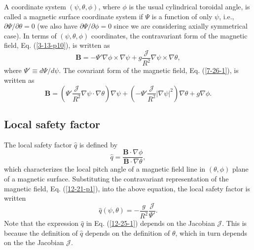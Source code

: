 \documentclass{llncs}
\begin{document}
A coordinate system $(\psi, \theta, \phi)$, where $\phi$ is the usual
cylindrical toroidal angle, is called a magnetic surface coordinate system if
$\Psi$ is a function of only $\psi$, i.e., $\partial \Psi / \partial \theta =
0$ (we also have $\partial \Psi / \partial \phi = 0$ since we are considering
axially symmetrical case). In terms of $(\psi, \theta, \phi)$ coordinates, the
contravariant form of the magnetic field, Eq. (\ref{3-13-p10}), is written as
\begin{equation}
  \label{12-21-p1} \mathbf{B}= - \Psi' \nabla \phi \times \nabla \psi + g
  \frac{\mathcal{J}}{R^2} \nabla \psi \times \nabla \theta,
\end{equation}
where $\Psi' \equiv d \Psi / d \psi$. The covariant form of the magnetic
field, Eq. (\ref{7-26-1}), is written as
\begin{equation}
  \label{5-6-2} \mathbf{B}= \left( \Psi' \frac{\mathcal{J}}{R^2} \nabla \psi
  \cdot \nabla \theta \right) \nabla \psi + \left( - \Psi'
  \frac{\mathcal{J}}{R^2} | \nabla \psi |^2 \right) \nabla \theta + g \nabla
  \phi .
\end{equation}

\subsection{Local safety factor}\label{7-25-e5}

The local safety factor $\hat{q}$ is defined by
\begin{equation}
  \label{7-12-a4} \hat{q} = \frac{\mathbf{B} \cdot \nabla \phi}{\mathbf{B}
  \cdot \nabla \theta},
\end{equation}
which characterizes the local pitch angle of a magnetic field line in
$(\theta, \phi)$ plane of a magnetic surface. Substituting the contravariant
representation of the magnetic field, Eq. (\ref{12-21-p1}), into the above
equation, the local safety factor is written
\begin{equation}
  \label{12-25-1} \hat{q} (\psi, \theta) = - \frac{g}{R^2} 
  \frac{\mathcal{J}}{\Psi'} .
\end{equation}
Note that the expression $\hat{q}$ in Eq. (\ref{12-25-1}) depends on the
Jacobian $\mathcal{J}$. This is because the definition of $\hat{q}$ depends on
the definition of $\theta$, which in turn depends on the the Jacobian
$\mathcal{J}$.
\end{document}
